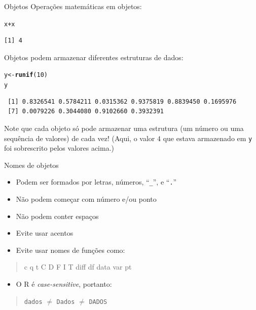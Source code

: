 \documentclass[10pt,handout]{beamer}\usepackage[]{graphicx}\usepackage[]{color}
\makeatletter
\newcommand{\hlnum}[1]{\textcolor[rgb]{0.686,0.059,0.569}{#1}}%
\newcommand{\hlopt}[1]{\textcolor[rgb]{0,0,0}{#1}}%
\newcommand{\hlstd}[1]{\textcolor[rgb]{0.345,0.345,0.345}{#1}}%
\newcommand{\hlkwb}[1]{\textcolor[rgb]{0.69,0.353,0.396}{#1}}%
\newcommand{\hlkwd}[1]{\textcolor[rgb]{0.737,0.353,0.396}{\textbf{#1}}}%
\newenvironment{kframe}{%
 \def\at@end@of@kframe{}%
 \ifinner\ifhmode%
  \def\at@end@of@kframe{\end{minipage}}%
  \begin{minipage}{\columnwidth}%
 \fi\fi%
 \def\FrameCommand##1{\hskip\@totalleftmargin \hskip-\fboxsep
 \colorbox{shadecolor}{##1}\hskip-\fboxsep
     \hskip-\linewidth \hskip-\@totalleftmargin \hskip\columnwidth}%
 \MakeFramed {\advance\hsize-\width
   \@totalleftmargin\z@ \linewidth\hsize
   \@setminipage}}%
 {\par\unskip\endMakeFramed%
 \at@end@of@kframe}
\newenvironment{knitrout}{}{} %
\makeatother
\begin{document}
\begin{frame}[fragile]{Objetos}
Operações matemáticas em objetos:
\begin{knitrout}\small
{}\color{fgcolor}\begin{kframe}
\begin{alltt}
\hlstd{x} \hlopt{+} \hlstd{x}
\end{alltt}
\begin{verbatim}
[1] 4
\end{verbatim}
\end{kframe}
\end{knitrout}
Objetos podem armazenar diferentes estruturas de dados:
\begin{knitrout}\small
{}\color{fgcolor}\begin{kframe}
\begin{alltt}
\hlstd{y} \hlkwb{<-} \hlkwd{runif}\hlstd{(}\hlnum{10}\hlstd{)}
\hlstd{y}
\end{alltt}
\begin{verbatim}
 [1] 0.8326541 0.5784211 0.0315362 0.9375819 0.8839450 0.1695976
 [7] 0.0079226 0.3044080 0.9102660 0.3932391
\end{verbatim}
\end{kframe}
\end{knitrout}
Note que cada objeto só pode armazenar uma estrutura (um número ou uma
sequência de valores) de cada vez! (Aqui, o valor $4$ que estava
armazenado em \verb|y| foi sobrescrito pelos valores acima.)
\end{frame}

\begin{frame}[fragile]{Nomes de objetos}
\begin{itemize}
\item Podem ser formados por letras, números, ``\verb|_|'', e
  ``\texttt{.}''
\item Não podem começar com número e/ou ponto
\item Não podem conter espaços
\item Evite usar acentos
\item Evite usar nomes de funções como:
\end{itemize}
\begin{quote}
\begin{center}
\ttfamily \upshape
c q t C D F I T diff df data var pt
\end{center}
\end{quote}
\begin{itemize}
\item O R é \emph{case-sensitive}, portanto:
\end{itemize}
\begin{quote}
\begin{center}
\ttfamily \upshape
\texttt{dados} $\neq$ \texttt{Dados} $\neq$ \texttt{DADOS}
\end{center}
\end{quote}
\end{frame}
\end{document}
